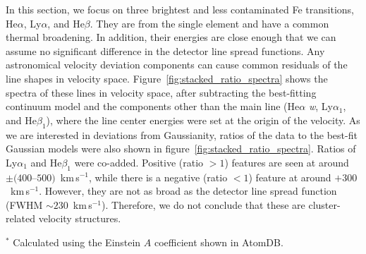 In this section, we focus on three brightest and less contaminated Fe transitions, He$\alpha$, Ly$\alpha$, and He$\beta$. They are from the single element and have a common thermal broadening. In addition, their energies are close enough that we can assume no significant difference in the detector line spread functions. Any astronomical velocity deviation components can cause common residuals of the line shapes in velocity space. Figure~\ref{fig:stacked_ratio_spectra} shows the spectra of these lines in velocity space, after subtracting the best-fitting continuum model and the components other than the main line (He$\alpha$ {\it w}, Ly$\alpha_1$, and He$\beta_1$), where the line center energies were set at the origin of the velocity. As we are interested in deviations from Gaussianity, ratios of the data to the best-fit Gaussian models were also shown in figure~\ref{fig:stacked_ratio_spectra}. Ratios of Ly$\alpha_1$ and He$\beta_1$ were co-added. Positive (ratio $>1$) features are seen at around $\pm(400$--$500)$~km\,s$^{-1}$, while there is a negative (ratio $<1$) feature at around $+300$~km\,s$^{-1}$. However, they are not as broad as the detector line spread function (FWHM $\sim230$~km\,s$^{-1}$). Therefore, we do not conclude that these are cluster-related velocity structures.


\begin{table*}
 \label{tab:width_obs234_Voigt}
\begin{tabnote}
$^*$ Calculated using the Einstein $A$ coefficient shown in AtomDB.\\
\end{tabnote}
\end{table*}

